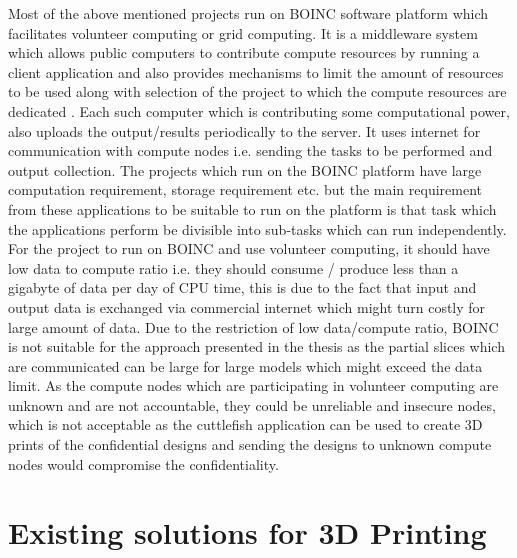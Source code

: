 Most of the above mentioned projects run on BOINC software platform which facilitates volunteer computing or grid computing. It is a middleware system which allows public computers to contribute compute resources by running a client application and also provides mechanisms to limit the amount of resources to be used along with selection of the project to which the compute resources are dedicated \cite{BOINC}. Each such computer which is contributing some computational power, also uploads the output/results periodically to the server. It uses internet for communication with compute nodes i.e. sending the tasks to be performed and output collection. The projects which run on the BOINC platform have large computation requirement, storage requirement etc. but the main requirement from these applications to be suitable to run on the platform is that task which the applications perform be divisible into sub-tasks which can run independently. For the project to run on BOINC and use volunteer computing, it should have low data to compute ratio i.e. they should consume / produce less than a gigabyte of data per day of CPU time, this is due to the fact that input and output data is exchanged via commercial internet which might turn costly for large amount of data.  Due to the restriction of low data/compute ratio, BOINC is not suitable for the approach presented in the thesis as the partial slices which are communicated can be large for large models which might exceed the data limit. As the compute nodes which are participating in volunteer computing are unknown and are not accountable, they could be unreliable and insecure nodes, which is not acceptable as the cuttlefish application can be used to create 3D prints of the confidential designs and sending the designs to unknown compute nodes would compromise the confidentiality. \newline

\section{Existing solutions for 3D Printing}

